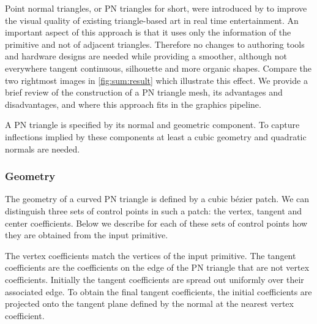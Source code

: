 \noindent Point normal triangles, or PN triangles for short, were introduced by \textcite{vlachos2001curved} to improve the visual quality of existing triangle-based art in real time entertainment. An important aspect of this approach is that it uses only the information of the primitive and not of adjacent triangles. Therefore no changes to authoring tools and hardware designs are needed while providing a smoother, although not everywhere tangent continuous, silhouette and more organic shapes. Compare the two rightmost images in \cref{fig:sum:result} which illustrate this effect. We provide a brief review of the construction of a PN triangle mesh, its advantages and disadvantages, and where this approach fits in the graphics pipeline. 

\begin{figure*}
	\centering
	\caption{From left to right (a) Input triangulation, (b) Gouraud shaded input triangulation, (c) geometric component of the PN triangles (shaded according to surface normal variation), and (d) curved PN Triangles (shaded with independently constructed quadratically varying normals)}
	\label{fig:sum:result}
\end{figure*}

A PN triangle is specified by its normal and geometric component. To capture inflections implied by these components at least a cubic geometry and quadratic normals are needed.

\subsubsection*{Geometry}
The geometry of a curved PN triangle is defined by a cubic b\'ezier patch. We can distinguish three sets of control points in such a patch: the vertex, tangent and center coefficients. Below we describe for each of these sets of control points how they are obtained from the input primitive. 

The vertex coefficients match the vertices of the input primitive. The tangent coefficients are the coefficients on the edge of the PN triangle that are not vertex coefficients. Initially the tangent coefficients are spread out uniformly over their associated edge. To obtain the final tangent coefficients, the initial coefficients are projected onto the tangent plane defined by the normal at the nearest vertex coefficient. 

